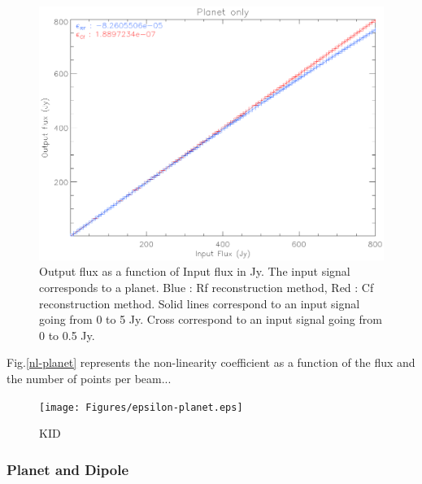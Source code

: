 \begin{figure}[h]
\center
	\includegraphics[scale=0.5]{Figures/nl-planet.eps}
	\caption{Output flux as a function of Input flux in Jy. The input signal corresponds to a planet. Blue : Rf reconstruction method, Red : Cf reconstruction method. Solid lines correspond to an input signal going from 0 to 5 Jy. Cross correspond to an input signal going from 0 to 0.5 Jy.}
	\label{epsilon-planet}
\end{figure}

Fig.\ref{nl-planet} represents the non-linearity coefficient as a function of the flux and the number of points per beam...

\begin{figure}[h]
\center
	\texttt{[image: Figures/epsilon-planet.eps]}
	\caption{KID}
	\label{epsilon-planet}
\end{figure}

\subsubsection{Planet and Dipole}

